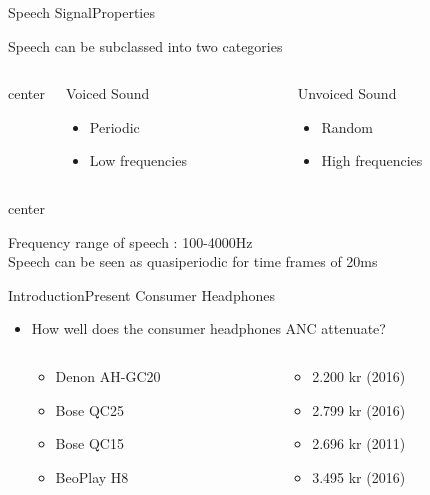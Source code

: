 \begin{frame}{Speech Signal}{Properties}
	\begin{center}
 	Speech can be subclassed into two categories	
 	\end{center}
 	\vspace{0.5cm}
	\begin{columns}{center}
		\begin{column}{0.5\textwidth}
		Voiced Sound
		\begin{itemize}
			\item Periodic 
			\item Low frequencies
		\end{itemize}
		\end{column}
		\begin{column}{0.5\textwidth} 
		Unvoiced Sound 
		\begin{itemize}
			\item Random
			\item High frequencies
		\end{itemize}		
		\end{column}
	\end{columns}{center}
	\begin{center}
	\vspace{1cm}
	Frequency range of speech : 100-4000Hz \\
	Speech can be seen as quasiperiodic for time frames of 20ms 
\end{center}
\end{frame}

\begin{frame}{Introduction}{Present Consumer Headphones}
	\begin{itemize}	
	\item How well does the consumer headphones ANC attenuate?
	\begin{columns}
		\begin{column}{0.27\textwidth}
		\begin{itemize}
			\item Denon AH-GC20
			\item Bose QC25 
			\item Bose QC15 	
			\item BeoPlay H8 	
		\end{itemize}
		\end{column}
		\begin{column}{0.6\textwidth} 
		\begin{itemize}
			\item[] 2.200 kr (2016)
			\item[] 2.799 kr (2016)
			\item[] 2.696 kr (2011)
			\item[] 3.495 kr (2016)
		\end{itemize}
		\end{column}
	\end{columns}
	\end{itemize}			
	\begin{center}
		
	\end{center}	
\end{frame}

